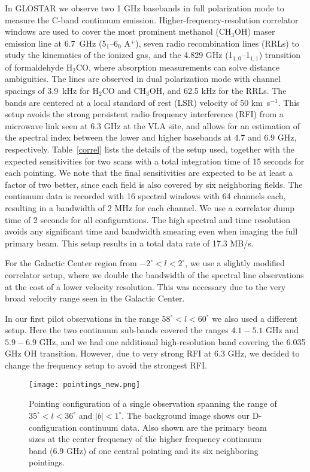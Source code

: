 \documentclass{aa}
\newcommand{\kms}{km~s$^{-1}$}
\DeclareRobustCommand{\kms}{km\,${\rm s}^{-1}$}
\begin{document}
In GLOSTAR we observe two 1 GHz  basebands in full polarization mode to measure the C-band continuum emission. Higher-frequency-resolution  correlator windows are used to cover the  most prominent methanol (CH$_3$OH) maser emission line at 6.7~GHz (5$_{1}$--6$_{0}$ A$^{+}$), seven radio recombination lines (RRLs) to study the kinematics of the ionized gas, and the 4.829 GHz (1$_{1,0}$--1$_{1,1}$) transition of formaldehyde H$_2$CO, where absorption measurements can solve distance ambiguities. The lines are observed in dual polarization mode with channel spacings of \mbox{3.9 kHz} for H$_2$CO and CH$_3$OH, and 62.5 kHz for the RRLs. The bands are centered at a local standard of rest (LSR) velocity of 50 \kms. This setup avoids the strong persistent radio frequency interference (RFI) from a microwave link seen at 6.3 GHz at the VLA site, and allows for an estimation of the spectral index  between the lower and higher basebands at 4.7 and 6.9 GHz, respectively. Table~\ref{correl} lists the details of the  setup used, together with the expected sensitivities for two scans with a total integration time of 15 seconds for each pointing. We note that the final sensitivities are expected to be at least a factor of two better, since each field is also covered by six neighboring fields. The continuum data is recorded with 16 spectral windows with 64 channels each, resulting in a bandwidth of 2 MHz for each channel. We use a correlator dump time of 2 seconds for all configurations. The high spectral and time resolution avoids any significant time and bandwidth smearing even when imaging the full primary beam. This setup results in a total data rate of 17.3 MB/s. 

For the Galactic Center region from $-2^\circ<l<2^\circ$, we use a slightly modified correlator setup, where we double the bandwidth of the spectral line observations at the cost of a lower velocity resolution. This was necessary due to the very broad velocity range seen in the Galactic Center.

In our first pilot observations in the range $58^\circ<l<60^\circ$ we also used a different setup. Here the two continuum sub-bands covered the ranges  $4.1-5.1$ GHz and $5.9-6.9$ GHz, and we had one additional high-resolution band covering the 6.035 GHz OH transition. However, due to very strong RFI at 6.3 GHz, we decided to change the frequency setup to avoid the strongest RFI.



\begin{figure}
\texttt{[image: pointings\_new.png]}
\caption{Pointing configuration of a single observation spanning the range of $35^\circ<l<36^\circ$ and $|b|<1^\circ$. The background image shows our D-configuration continuum data. Also shown are the primary beam sizes at the center frequency of the higher frequency continuum band (6.9 GHz) of one central pointing and its six neighboring pointings.}
\label{fig:pointings}
\end{figure}
\end{document}
